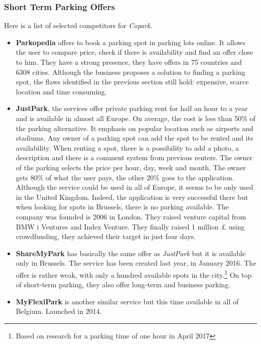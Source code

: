 \documentclass[12pt,a4paper,oneside]{book}
\newcommand{\bp}{\textit{Copark}}
\begin{document}
\subsubsection{Short Term Parking Offers}

Here is a list of selected competitors for \bp{}.

\begin{itemize}
\item \textbf{Parkopedia} offers to book a parking spot in parking lots online. It allows the user to compare price, check if there is availability and find an offer close to him. They have a strong presence, they have offers in 75 countries and 6308 cities. Although the business proposes a solution to finding a parking spot, the flaws identified in the previous section still hold: expensive, scarce location and time consuming.
\item \textbf{JustPark}, the services offer private parking rent for half an hour to a year and is available in almost all Europe. On average, the cost is less than 50\% of the parking alternative. It emphasis on popular location such as airports and stadiums. Any owner of a parking spot can add the spot to be rented and its availability. When renting a spot, there is a possibility to add a photo, a description and there is a comment system from previous renters. The owner of the parking selects the price per hour, day, week and month. The owner gets 80\% of what the user pays, the other 20\% goes to the application. Although the service could be used in all of Europe, it seems to be only used in the United Kingdom. Indeed, the application is very successful there but when looking for spots in Brussels, there is no parking available. The company was founded is 2006 in London. They raised venture capital from BMW i Ventures and Index Venture.\cite{bmwi,iven} They finally raised 1 million £ using crowdfunding, they achieved their target in just four days.\cite{crowd}
\item \textbf{ShareMyPark} has basically the same offer as \textit{JustPark} but it is available only in Brussels. The service has been created last year, in January 2016. The offer is rather weak, with only a hundred available spots in the city.\footnote{Based on research for a parking time of one hour in April 2017} On top of short-term parking, they also offer long-term and business parking.
\item \textbf{MyFlexiPark} is another similar service but this time available in all of Belgium. Launched in 2014.
\end{itemize}
\end{document}
